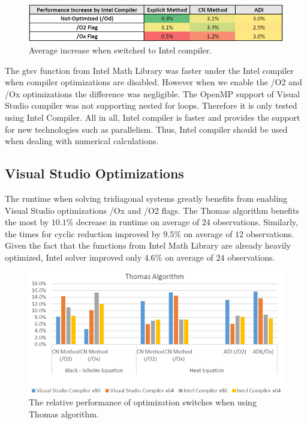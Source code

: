 \documentclass[12pt, oneside]{book}
\theoremstyle{plain}
\theoremstyle{definition}
\begin{document}
\begin{figure}[!htb]
    \centering
        \includegraphics[scale=0.8]{compilerPercent.png}
    \caption{Average increase when switched to Intel compiler.}
\end{figure}

The gtsv function from Intel Math Library was faster under the Intel compiler when compiler optimizations are disabled. However when we enable the /O2 and /Ox optimizations the difference was negligible. The OpenMP support of Visual Studio compiler was not supporting nested for loops. Therefore it is only tested using Intel Compiler. All in all, Intel compiler is faster and provides the support for new technologies such as parallelism. Thus, Intel compiler should be used when dealing with numerical calculations.


\subsection{Visual Studio Optimizations}
The runtime when solving tridiagonal systems greatly benefits from enabling Visual Studio optimizations /Ox and /O2 flags. The Thomas algorithm benefits the most by $10.1 \%$ decrease in runtime on average of  $24$ observations. Similarly, the times for cyclic reduction improved  by $9.5 \%$ on average of $12$ observations. Given the fact that the functions from Intel Math Library are already heavily optimized,  Intel solver improved only $4.6 \%$ on average of $24$ observations. 

\begin{figure}[!htb]
    \centering
    \includegraphics[scale=0.6]{thomasFlagBar.png}
    \caption{The relative performance of optimization switches when using Thomas algorithm.}
\end{figure}
\end{document}
